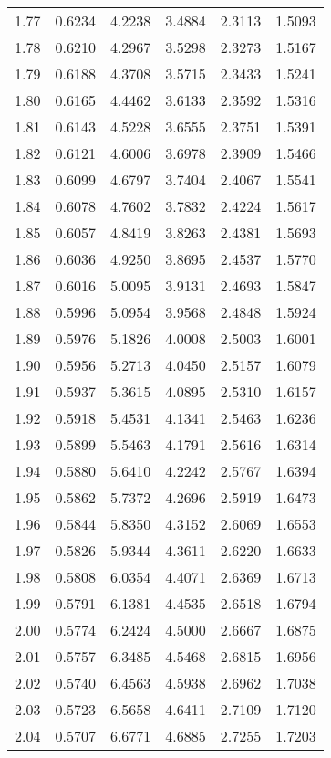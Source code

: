 \documentclass{article}
\begin{document}
\begin{longtable}{cccccc}
1.77 & 0.6234 & 4.2238 & 3.4884 & 2.3113 & 1.5093 \\
1.78 & 0.6210 & 4.2967 & 3.5298 & 2.3273 & 1.5167 \\
1.79 & 0.6188 & 4.3708 & 3.5715 & 2.3433 & 1.5241 \\
1.80 & 0.6165 & 4.4462 & 3.6133 & 2.3592 & 1.5316 \\
1.81 & 0.6143 & 4.5228 & 3.6555 & 2.3751 & 1.5391 \\
1.82 & 0.6121 & 4.6006 & 3.6978 & 2.3909 & 1.5466 \\
1.83 & 0.6099 & 4.6797 & 3.7404 & 2.4067 & 1.5541 \\
1.84 & 0.6078 & 4.7602 & 3.7832 & 2.4224 & 1.5617 \\
1.85 & 0.6057 & 4.8419 & 3.8263 & 2.4381 & 1.5693 \\
1.86 & 0.6036 & 4.9250 & 3.8695 & 2.4537 & 1.5770 \\
1.87 & 0.6016 & 5.0095 & 3.9131 & 2.4693 & 1.5847 \\
1.88 & 0.5996 & 5.0954 & 3.9568 & 2.4848 & 1.5924 \\
1.89 & 0.5976 & 5.1826 & 4.0008 & 2.5003 & 1.6001 \\
1.90 & 0.5956 & 5.2713 & 4.0450 & 2.5157 & 1.6079 \\
1.91 & 0.5937 & 5.3615 & 4.0895 & 2.5310 & 1.6157 \\
1.92 & 0.5918 & 5.4531 & 4.1341 & 2.5463 & 1.6236 \\
1.93 & 0.5899 & 5.5463 & 4.1791 & 2.5616 & 1.6314 \\
1.94 & 0.5880 & 5.6410 & 4.2242 & 2.5767 & 1.6394 \\
1.95 & 0.5862 & 5.7372 & 4.2696 & 2.5919 & 1.6473 \\
1.96 & 0.5844 & 5.8350 & 4.3152 & 2.6069 & 1.6553 \\
1.97 & 0.5826 & 5.9344 & 4.3611 & 2.6220 & 1.6633 \\
1.98 & 0.5808 & 6.0354 & 4.4071 & 2.6369 & 1.6713 \\
1.99 & 0.5791 & 6.1381 & 4.4535 & 2.6518 & 1.6794 \\
2.00 & 0.5774 & 6.2424 & 4.5000 & 2.6667 & 1.6875 \\
2.01 & 0.5757 & 6.3485 & 4.5468 & 2.6815 & 1.6956 \\
2.02 & 0.5740 & 6.4563 & 4.5938 & 2.6962 & 1.7038 \\
2.03 & 0.5723 & 6.5658 & 4.6411 & 2.7109 & 1.7120 \\
2.04 & 0.5707 & 6.6771 & 4.6885 & 2.7255 & 1.7203 \\

\end{longtable}
\end{document}
